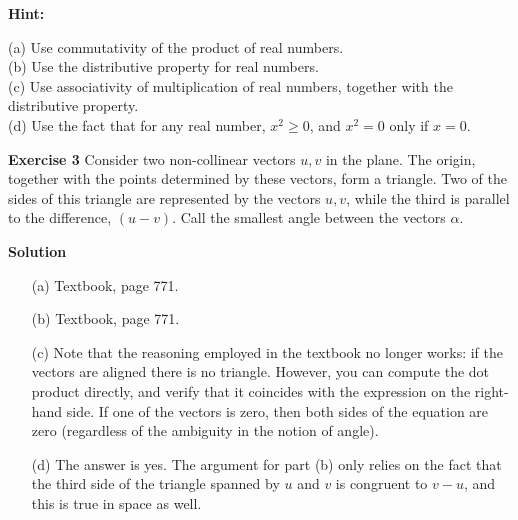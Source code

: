 \documentclass[12pt,oneside]{exam}
\newenvironment{exercise}[1]{\vspace{.1in}\noindent\textbf{Exercise #1 \hspace{.05em}}}{}
\newenvironment{newsolution}{\vspace{.1in}\noindent\textbf{Solution \hspace{.05em}}}{}
\begin{document}
\textbf{Hint:} 

(a) Use commutativity of the product of real numbers. \\
(b) Use the distributive property for real numbers. \\
(c) Use associativity of multiplication of real numbers, together with the distributive property. \\
(d) Use the fact that for any real number, $x^2 \geq 0$, and $x^2=0$ only if $x=0$. 


\begin{exercise}{3}
Consider two non-collinear vectors $u,v$ in the plane. The origin, together with the points determined by these vectors, form a triangle. Two of the sides of this triangle are represented by the vectors $u,v$, while the third is parallel to the difference, $(u-v)$. Call the smallest angle between the vectors $\alpha$. 
\end{exercise}

\begin{newsolution}
\begin{itemize}
\item[(a)] Textbook, page 771. 
\item[(b)] Textbook, page 771.
\item[(c)] Note that the reasoning employed in the textbook no longer works: if the vectors are aligned there is no triangle. However, you can compute the dot product directly, and verify that it coincides with the expression on the right-hand side. If one of the vectors is zero, then both sides of the equation are zero (regardless of the ambiguity in the notion of angle).
\item[(d)] The answer is yes. The argument for part (b) only relies on the fact that the third side of the triangle spanned by $u$ and $v$ is congruent to $v-u$, and this is true in space as well.
\end{itemize}
\end{newsolution} 
\end{document}

